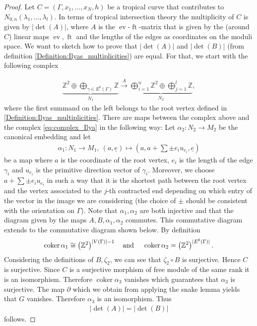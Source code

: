 \documentclass[11pt,reqno,a4]{amsart}
\theoremstyle{dotless}
\theoremstyle{definition}
\newcommand{\ft}{\operatorname{ft}}
\newcommand{\ev}{\operatorname{ev}}
\newcommand{\coker}{\operatorname{coker}}
\begin{document}
\begin{proof}
Let $C=(\Gamma,x_1,\dots,x_N,h)$ be a tropical curve that contributes to $N_{0,n}\left(\lambda_1,\dots,\lambda_l\right)$.
In terms of tropical intersection theory the multiplicity of $C$ is given by $|\det(A)|$, where $A$ is the $\ev$-$\ft$-matrix that is given by the (around $C$) linear maps $\ev,\ft$ and the lengths of the edges as coordinates on the moduli space. We want to sketch how to prove that $|\det(A)|$ and $|\det(B)|$ (from definition \ref{Definition:Ilyas_multiplicities}) are equal. For that, we start with the following complex

\begin{align*}
\underbrace{\mathbb{Z}^2\oplus\bigoplus_{\gamma\in E^b(\Gamma)} \mathbb{Z}}_{N_1} \overset{A}{\longrightarrow} \underbrace{\bigoplus_{i=1}^n \mathbb{Z}^2\oplus \bigoplus_{j=1}^l \mathbb{Z}}_{N_2},
\end{align*}
where the first summand on the left belongs to the root vertex defined in \ref{Definition:Ilyas_multiplicities}. There are maps between the complex above and the complex \eqref{eq:complex_Ilya} in the following way: Let $\alpha_2:N_2\to M_2$ be the canonical embedding and let 
\begin{align*}
\alpha_1:N_1\to M_1,\ (a,\underline{e})\mapsto (a,a+\sum\pm e_i u_{e_i},\underline{e})
\end{align*}
be a map where $a$ is the coordinate of the root vertex, $e_i$ is the length of the edge $\gamma_i$ and $u_{e_i}$ is the primitive direction vector of $\gamma_i$. Moreover, we choose $a+\sum\pm e_i u_{e_i}$ in such a way that it is the shortest path between the root vertex and the vertex associated to the $j$-th contracted end depending on which entry of the vector in the image we are considering (the choice of $\pm$ should be consistent with the orientation on $\Gamma$). Note that $\alpha_1,\alpha_2$ are both injective and that the diagram given by the maps $A,B,\alpha_1,\alpha_2$ commutes. This commutative diagram extends to the commutative diagram shown below. By definition
\begin{align*}
\coker \alpha_1 \cong \left(\mathbb{Z}^2\right)^{|V(\Gamma)|-1} \textrm{\quad and \quad} \coker \alpha_2 =\left(\mathbb{Z}^2\right)^{|E^b(\Gamma)|}.
\end{align*}
Considering the definitions of $B,\zeta_2$, we can see that $\zeta_2\circ B$ is surjective. Hence $C$ is surjective. Since $C$ is a surjective morphism of free module of the same rank it is an isomorphism. Therefore $\coker \alpha_3$ vanishes which guarantees that $\alpha_3$ is surjective. The map $\partial$ which we obtain from applying the snake lemma yields that $G$ vanishes. Therefore $\alpha_3$ is an isomorphism. Thus
\begin{align*}
|\det(A)| = |\det(B)|
\end{align*}
follows.


\end{proof}
\end{document}
